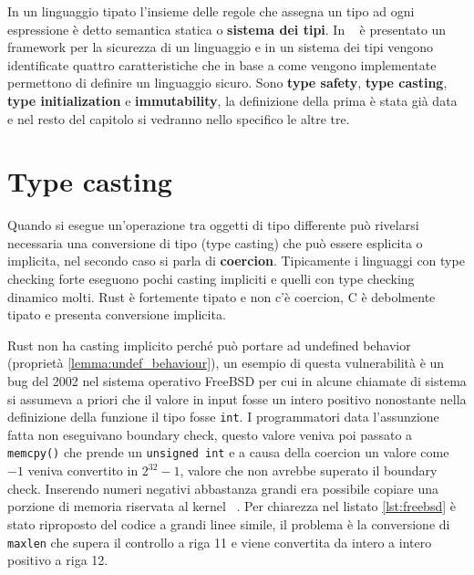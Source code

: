 \documentclass[Lau,binding=0.6cm]{sapthesis}
\newcommand{\textcode}[1]{\colorbox{backcolour}{\texttt{#1}}}
\begin{document}







In un linguaggio tipato l'insieme delle regole che assegna un tipo ad ogni espressione è detto semantica statica o \textbf{sistema dei tipi}.
In ~\cite{security_framework} è presentato un framework per la sicurezza di un linguaggio e in un sistema dei tipi vengono identificate quattro caratteristiche che in base a come vengono implementate permettono di definire un linguaggio sicuro.
Sono \textbf{type safety}, \textbf{type casting}, \textbf{type initialization} e \textbf{immutability}, la definizione della prima è stata già data e nel resto del capitolo si vedranno nello specifico le altre tre.


\section{Type casting}
Quando si esegue un'operazione tra oggetti di tipo differente può rivelarsi necessaria una conversione di tipo (type casting) che può essere esplicita o implicita, nel secondo caso si parla di \textbf{coercion}.
Tipicamente i linguaggi con type checking forte eseguono pochi casting impliciti e quelli con type checking dinamico molti.
Rust è fortemente tipato e non c'è coercion, C è debolmente tipato e presenta conversione implicita.   







Rust non ha casting implicito perché può portare ad undefined behavior (proprietà \ref{lemma:undef_behaviour}), un esempio di questa vulnerabilità è un bug del 2002 nel sistema operativo FreeBSD per cui in alcune chiamate di sistema si assumeva a priori che il valore in input fosse un intero positivo nonostante nella definizione della funzione il tipo fosse \textcode{int}.
I programmatori data l'assunzione fatta non eseguivano boundary check, questo valore veniva poi passato a \textcode{memcpy()} che prende un \textcode{unsigned int} e a causa della coercion un valore come $ -1 $ veniva convertito in $ 2^{32}-1 $, valore che non avrebbe superato il boundary check.
Inserendo numeri negativi abbastanza grandi era possibile copiare una porzione di memoria riservata al kernel ~\cite{freeBSD_vulnerability}.
Per chiarezza nel listato \ref{lst:freebsd} è stato riproposto del codice a grandi linee simile, il problema è la conversione di \texttt{maxlen} che supera il controllo a riga 11 e viene convertita da intero a intero positivo a riga 12. 
\end{document}

